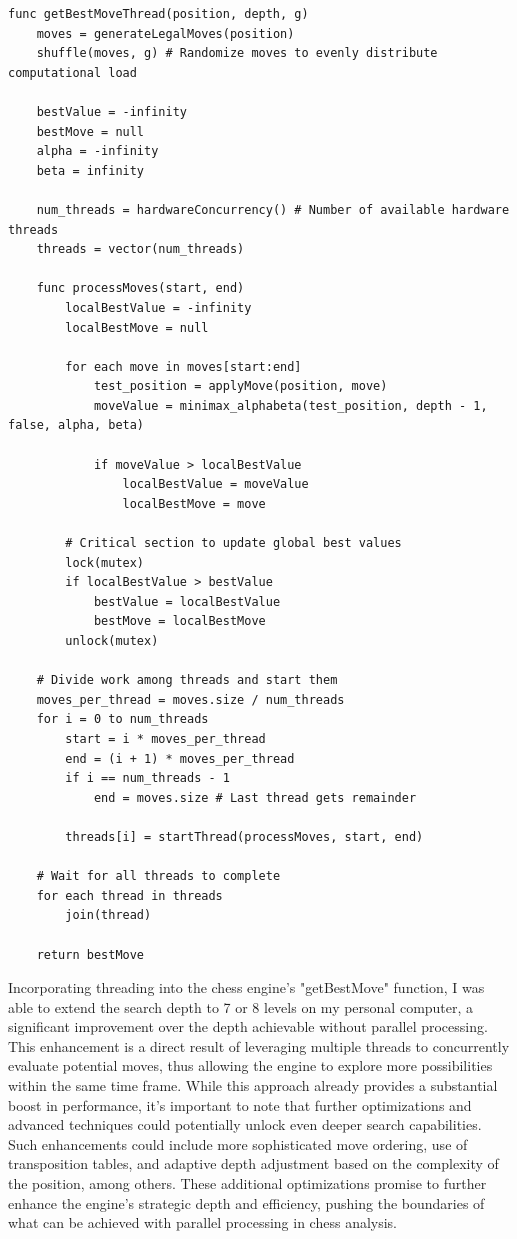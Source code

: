 \documentclass{article}
\begin{document}
\begin{lstlisting}[caption= Threading in Getting Best Move, label=lst:pseudocode]
func getBestMoveThread(position, depth, g)
    moves = generateLegalMoves(position)
    shuffle(moves, g) # Randomize moves to evenly distribute computational load

    bestValue = -infinity
    bestMove = null
    alpha = -infinity
    beta = infinity

    num_threads = hardwareConcurrency() # Number of available hardware threads
    threads = vector(num_threads)

    func processMoves(start, end)
        localBestValue = -infinity
        localBestMove = null

        for each move in moves[start:end]
            test_position = applyMove(position, move)
            moveValue = minimax_alphabeta(test_position, depth - 1, false, alpha, beta)

            if moveValue > localBestValue
                localBestValue = moveValue
                localBestMove = move

        # Critical section to update global best values
        lock(mutex)
        if localBestValue > bestValue
            bestValue = localBestValue
            bestMove = localBestMove
        unlock(mutex)

    # Divide work among threads and start them
    moves_per_thread = moves.size / num_threads
    for i = 0 to num_threads
        start = i * moves_per_thread
        end = (i + 1) * moves_per_thread
        if i == num_threads - 1
            end = moves.size # Last thread gets remainder

        threads[i] = startThread(processMoves, start, end)

    # Wait for all threads to complete
    for each thread in threads
        join(thread)

    return bestMove
\end{lstlisting}

Incorporating threading into the chess engine's "getBestMove" function, I was able to extend the search depth to 7 or 8 levels on my personal computer, a significant improvement over the depth achievable without parallel processing. This enhancement is a direct result of leveraging multiple threads to concurrently evaluate potential moves, thus allowing the engine to explore more possibilities within the same time frame. While this approach already provides a substantial boost in performance, it's important to note that further optimizations and advanced techniques could potentially unlock even deeper search capabilities. Such enhancements could include more sophisticated move ordering, use of transposition tables, and adaptive depth adjustment based on the complexity of the position, among others. These additional optimizations promise to further enhance the engine's strategic depth and efficiency, pushing the boundaries of what can be achieved with parallel processing in chess analysis.
\end{document}

